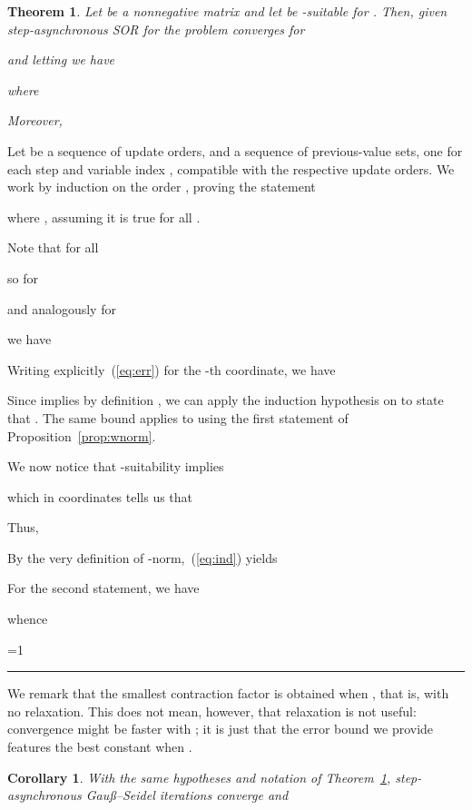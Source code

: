 \documentclass{article}
\newcommand{\Gauss}{Gau\ss}
\newcommand{\1}{\mathbf 1}
\newtheorem{theorem}{Theorem}
\newtheorem{corollary}{Corollary}
\newcounter{noqed}
\newcommand{\qed}{ \ifmmode\mbox{ }\fi\rule[-.05em]{.3em}{.7em}\setcounter{noqed}{0}}
\newenvironment{proof}[1][{}]{\noindent{\bf Proof#1. }\setcounter{noqed}{1}}{\ifnum\value{noqed}=1\qed\fi\par\medskip}
\begin{document}
\begin{theorem}
\label{teo:conv}
Let  be a nonnegative matrix and let 
be -suitable for .
Then, given  step-asynchronous SOR for the problem 
converges for 

 and letting  we have

where 

Moreover, 

\end{theorem}
\begin{proof}
Let  be a sequence of update orders, and 
 a sequence of previous-value sets, one for each step  and
variable index , compatible with the respective update orders.
We work by induction on the order
, proving the statement

where , assuming it is true for all
.

Note that for all 

so for 

and analogously for

we have



Writing explicitly~(\ref{eq:err}) for the -th coordinate, we have

Since  implies by definition , we can apply the
induction hypothesis on  to state that .
The same bound applies to  using
the first statement of Proposition~\ref{prop:wnorm}. 

We now notice that -suitability implies 

which in coordinates tells us that

Thus,

By the very definition of -norm,~(\ref{eq:ind}) yields



For the second statement, we have

whence 

\end{proof}

We remark that the smallest contraction factor is obtained when , that is, with no relaxation. This does not mean,
however, that relaxation is not useful: convergence might be faster with ; it is just that the error bound we
provide features the best constant when .

\begin{corollary}
\label{cor:bound}
With the same hypotheses and notation of Theorem~\ref{teo:conv}, step-asynchronous \Gauss--Seidel iterations converge and

\end{corollary}
\end{document}
